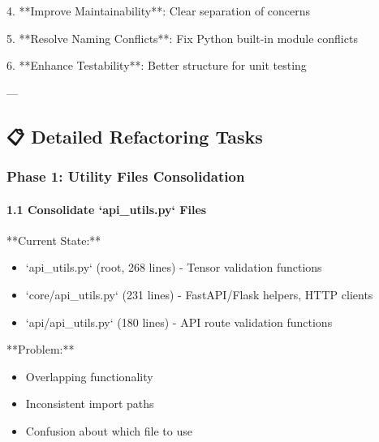 \documentclass[11pt,a4paper]{article}
\begin{document}
4. **Improve Maintainability**: Clear separation of concerns

5. **Resolve Naming Conflicts**: Fix Python built-in module conflicts

6. **Enhance Testability**: Better structure for unit testing

---

\subsection{📋 Detailed Refactoring Tasks}

\subsubsection{Phase 1: Utility Files Consolidation}

\paragraph{1.1 Consolidate `api_utils.py` Files}

**Current State:**

\begin{itemize}
\item `api_utils.py` (root, 268 lines) - Tensor validation functions
\end{itemize}

\begin{itemize}
\item `core/api_utils.py` (231 lines) - FastAPI/Flask helpers, HTTP clients
\end{itemize}

\begin{itemize}
\item `api/api_utils.py` (180 lines) - API route validation functions
\end{itemize}

**Problem:**

\begin{itemize}
\item Overlapping functionality
\end{itemize}

\begin{itemize}
\item Inconsistent import paths
\end{itemize}

\begin{itemize}
\item Confusion about which file to use
\end{itemize}
\end{document}
